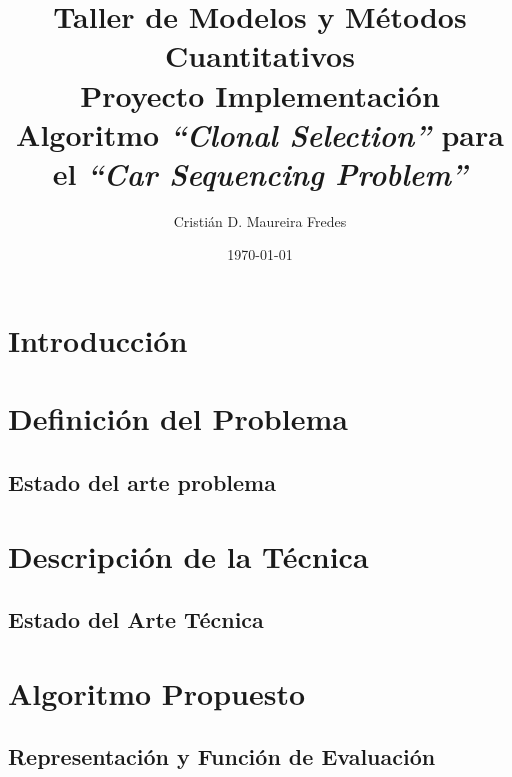 \documentclass[letter, 10pt]{article}
\begin{document}

\pagestyle{empty}



\title{
Taller de Modelos y Métodos Cuantitativos \\
\Large{
Proyecto Implementación Algoritmo \emph{``Clonal Selection''} para el \emph{``Car Sequencing Problem''}
}
}
\author{Cristián D. Maureira Fredes}
\date{\today}
\maketitle

\section{Introducción}
\label{sec:introduccion}


\newpage
\section{Definición del Problema}
\label{sec:definicion}


\newpage
\subsection{Estado del arte problema}
\label{sec:estadoArte}


\newpage
\section{Descripción de la Técnica}
\label{sec:tecnica}


\newpage
\subsection{Estado del Arte Técnica}
\label{sec:estadoArteTecnica}


\newpage
\section{Algoritmo Propuesto}
\label{sec:algoritmo}

\subsection{Representación y Función de Evaluación}
\label{sec:representacion}

\end{document}
